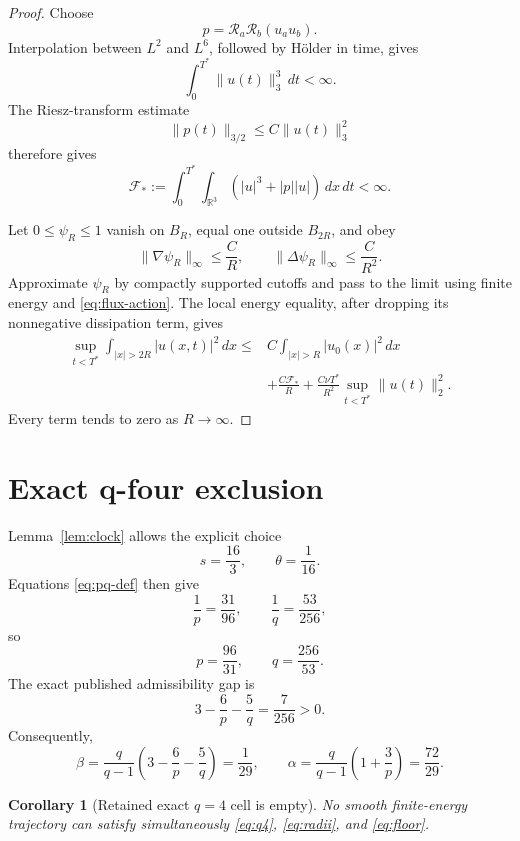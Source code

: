 \documentclass[11pt]{article}
\newtheorem{corollary}[theorem]{Corollary}
\theoremstyle{remark}
\newcommand{\R}{\mathbb R}
\begin{document}
\begin{proof}
Choose
\[
 p=\mathcal R_a\mathcal R_b(u_au_b).
\]
Interpolation between \(L^2\) and \(L^6\), followed by H\"older in time,
gives
\[
 \int_0^{T^*}\|u(t)\|_3^3\,dt<\infty.
\]
The Riesz-transform estimate
\[
 \|p(t)\|_{3/2}\le C\|u(t)\|_3^2
\]
therefore gives
\begin{equation}
 \label{eq:flux-action}
 \mathcal F_*
 :=
 \int_0^{T^*}\!\!\int_{\R^3}
 \left(|u|^3+|p||u|\right)\,dx\,dt
 <\infty.
\end{equation}

Let \(0\le\psi_R\le1\) vanish on \(B_R\), equal one outside \(B_{2R}\),
and obey
\[
 \|\nabla\psi_R\|_\infty\le\frac CR,
 \qquad
 \|\Delta\psi_R\|_\infty\le\frac C{R^2}.
\]
Approximate \(\psi_R\) by compactly supported cutoffs and pass to the limit
using finite energy and \eqref{eq:flux-action}.  The local energy equality,
after dropping its nonnegative dissipation term, gives
\[
\begin{aligned}
 \sup_{t<T^*}
 \int_{|x|>2R}|u(x,t)|^2\,dx
 \le{}&
 C\int_{|x|>R}|u_0(x)|^2\,dx\\
 &+\frac{C\mathcal F_*}{R}
 +\frac{C\nu T^*}{R^2}
 \sup_{t<T^*}\|u(t)\|_2^2.
\end{aligned}
\]
Every term tends to zero as \(R\to\infty\).
\end{proof}

\section{Exact q-four exclusion}

Lemma~\ref{lem:clock} allows the explicit choice
\[
 s=\frac{16}{3},
 \qquad
 \theta=\frac1{16}.
\]
Equations \eqref{eq:pq-def} then give
\[
 \frac1p=\frac{31}{96},
 \qquad
 \frac1q=\frac{53}{256},
\]
so
\begin{equation}
 \label{eq:explicit-pq}
 p=\frac{96}{31},
 \qquad
 q=\frac{256}{53}.
\end{equation}
The exact published admissibility gap is
\[
 3-\frac6p-\frac5q
 =
 \frac7{256}>0.
\]
Consequently,
\begin{equation}
 \label{eq:explicit-exponents}
 \beta
 =
 \frac{q}{q-1}
 \left(3-\frac6p-\frac5q\right)
 =
 \frac1{29},
 \qquad
 \alpha
 =
 \frac{q}{q-1}
 \left(1+\frac3p\right)
 =
 \frac{72}{29}.
\end{equation}

\begin{corollary}[Retained exact \(q=4\) cell is empty]
\label{cor:q4}
No smooth finite-energy trajectory can satisfy simultaneously
\eqref{eq:q4}, \eqref{eq:radii}, and \eqref{eq:floor}.
\end{corollary}
\end{document}
